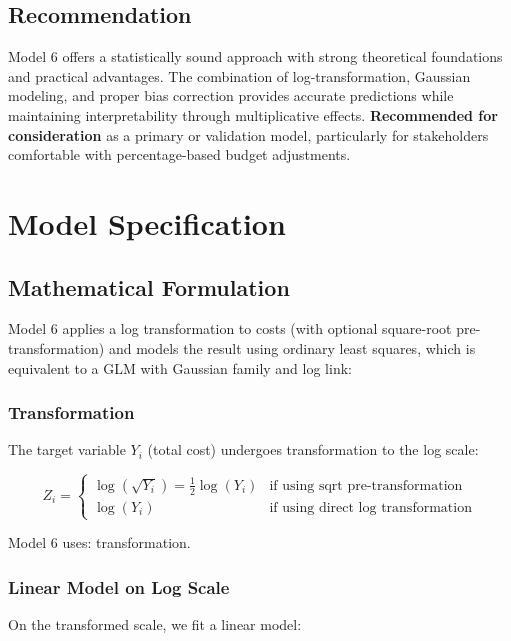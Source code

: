 \subsection{Recommendation}

Model 6 offers a statistically sound approach with strong theoretical foundations and practical advantages. The combination of log-transformation, Gaussian modeling, and proper bias correction provides accurate predictions while maintaining interpretability through multiplicative effects. \textbf{Recommended for consideration} as a primary or validation model, particularly for stakeholders comfortable with percentage-based budget adjustments.

\section{Model Specification}

\subsection{Mathematical Formulation}

Model 6 applies a log transformation to costs (with optional square-root pre-transformation) and models the result using ordinary least squares, which is equivalent to a GLM with Gaussian family and log link:

\subsubsection{Transformation}

The target variable $Y_i$ (total cost) undergoes transformation to the log scale:

\begin{equation}
Z_i = \begin{cases}
\log(\sqrt{Y_i}) = \frac{1}{2}\log(Y_i) & \text{if using sqrt pre-transformation} \\
\log(Y_i) & \text{if using direct log transformation}
\end{cases}
\end{equation}

Model 6 uses: \textbf{\ModelSixTransformation{}} transformation.

\subsubsection{Linear Model on Log Scale}

On the transformed scale, we fit a linear model:


